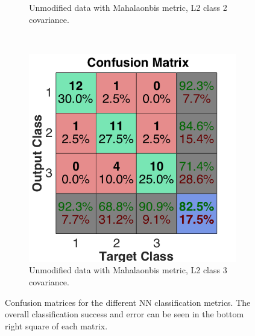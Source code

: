 \documentclass[a4paper, 10pt, conference]{ieeeconf}
\begin{document}
\begin{figure}[!ht]
\begin{subfigure}{0.32\textwidth}
      \caption{Unmodified data with Mahalaonbis metric, L2 class 2 covariance.}
    \end{subfigure}
    ~
    \begin{subfigure}{0.32\textwidth}
      \includegraphics[width=\textwidth]{pic/unmod_cov_l2_class3.png}
      \caption{Unmodified data with Mahalaonbis metric, L2 class 3 covariance.}
    \end{subfigure}
	\caption{Confusion matrices for the different NN classification metrics. The overall classification success and error can be seen in the bottom right square of each matrix. }
  \label{fig:nnconfuseunmod}
\end{figure}
\newpage
\end{document}
